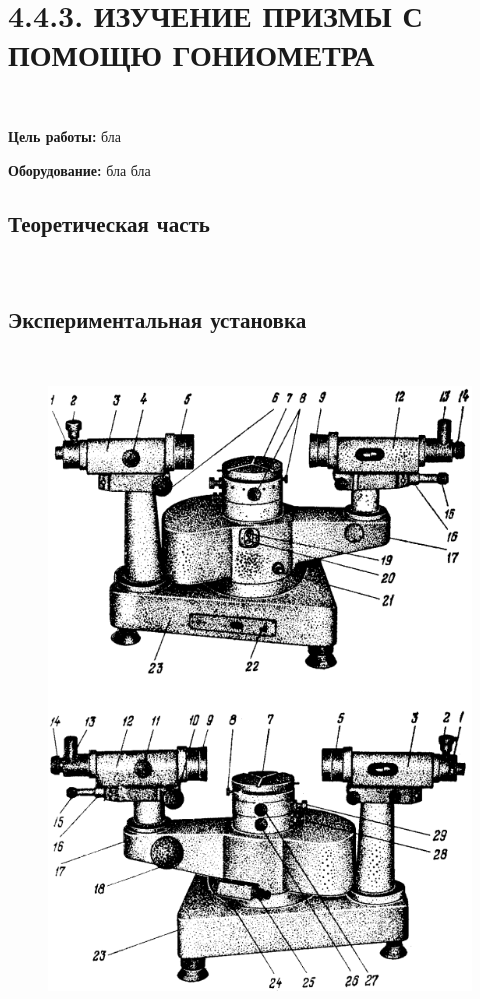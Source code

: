 \documentclass[12pt]{article}
\begin{document}
    \section*{4.4.3. ИЗУЧЕНИЕ ПРИЗМЫ С ПОМОЩЮ ГОНИОМЕТРА}
    \ \par
    \textbf{Цель работы:} бла

    \textbf{Оборудование:} бла бла

    \subsection*{Теоретическая часть}
    \ \par


    \subsection*{Экспериментальная установка}
    \ \par


    \begin{figure}[h]
        \centering
        \includegraphics[width=\linewidth]{pic/setup}
        \caption{}
        \label{fig:fig1}
    \end{figure}
\end{document}
